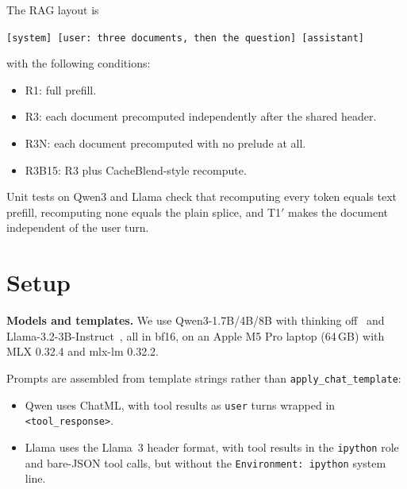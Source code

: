 \documentclass[10pt]{article}
\newcommand{\cond}[1]{\textsf{#1}}
\begin{document}
The RAG layout is
\begin{center}\small\texttt{[system] [user: three documents, then the question] [assistant]}\end{center}
with the following conditions:
\begin{itemize}\itemsep0pt
\item \cond{R1}: full prefill.
\item \cond{R3}: each document precomputed independently after the shared header.
\item \cond{R3N}: each document precomputed with no prelude at all.
\item \cond{R3B15}: \cond{R3} plus CacheBlend-style recompute.
\end{itemize}

Unit tests on Qwen3 and Llama check that recomputing every token equals text prefill, recomputing none equals the plain splice,
and \cond{T1$'$} makes the document independent of the user turn.

\section{Setup}
\textbf{Models and templates.} We use Qwen3-1.7B/4B/8B with thinking off~\citep{yang2025qwen3} and Llama-3.2-3B-Instruct~\citep{grattafiori2024llama3},
all in bf16, on an Apple M5 Pro laptop (64\,GB) with MLX 0.32.4 and mlx-lm 0.32.2.

Prompts are assembled from template strings rather than \texttt{apply\_chat\_template}:
\begin{itemize}\itemsep0pt
\item Qwen uses ChatML, with tool results as \texttt{user} turns wrapped in \texttt{<tool\_response>}.
\item Llama uses the Llama~3 header format, with tool results in the \texttt{ipython} role and bare-JSON tool calls, but without
  the \texttt{Environment: ipython} system line.
\end{itemize}
\end{document}
